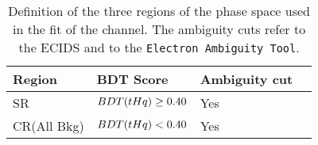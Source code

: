 \begin{table}[!htbp]
\centering
 \begin{adjustbox}{max width=0.95\textwidth}
\begin{tabular}{l|l|lc}
\toprule
Region     		& BDT Score            		& Ambiguity cut             \\ \midrule
SR         		& $BDT(tHq)\geq 0.40$ 	& Yes            	                	\\
CR(All Bkg)	& $BDT(tHq) < 0.40$ 	& Yes            	                	\\ \bottomrule
\end{tabular}
\end{adjustbox}
 \caption{Definition of the three regions of the phase space used in the fit of the 
 \dilepSStau channel. The ambiguity cuts refer to the ECIDS and to the \texttt{Electron Ambiguity Tool}.}
\label{tab:ChaptH:EventSelection:dilepSStau:RegionsSummary}
\end{table}









 




